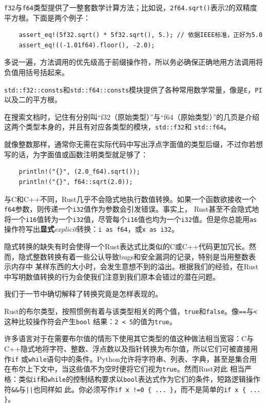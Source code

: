 \smallskip
\texttt{f32}与\texttt{f64}类型提供了一整套数学计算方法；比如说，\texttt{2f64.sqrt()}表示2的双精度平方根。下面是两个例子：
\begin{verbatim}
    assert_eq!(5f32.sqrt() * 5f32.sqrt(), 5.); // 依据IEEE标准，正好为5.0
    assert_eq!((-1.01f64).floor(), -2.0);
\end{verbatim}

\smallskip
多说一遍，方法调用的优先级高于前缀操作符，所以务必确保正确地用方法调用将负值用括号括起来。

\medskip
\texttt{std::f32::consts}和\texttt{std::f64::consts}模块提供了各种常用数学常量，像是\texttt{E}，\texttt{PI}以及二的平方根。

\medskip
在搜索文档时，记住有分别叫“f32（原始类型）”与“f64（原始类型）”的几页是介绍这两个类型本身的，并且有对应各类型的模块，\texttt{std::f32}和
\texttt{std::f64}。

\medskip
就像整数那样，通常你无需在实际代码中写出浮点字面值的类型后缀，不过你若想写的话，为字面值或函数注明类型就足够了：
\begin{verbatim}
    println!("{}", (2.0_f64).sqrt());
    println!("{}", f64::sqrt(2.0));
\end{verbatim}

\smallskip
与C和C++不同，Rust几乎不会隐式地执行数值转换。如果一个函数欲接收一个\texttt{f64}参数，则传递一个\texttt{i32}值作为参数会引发错误。事实上，
Rust甚至不会隐式地将一个\texttt{i16}值转为一个\texttt{i32}值，尽管每个\texttt{i16}值也均为一个\texttt{i32}值。但是你总能用\texttt{as}
操作符写出\textbf{显式}\textit{explicit}转换：\texttt{i as f64}，或\texttt{x as i32}。

\medskip
隐式转换的缺失有时会使得一个Rust表达式比类似的C或C++代码更加冗长。然而，隐式整数转换有着一些公认导致bugs和安全漏洞的记录，特别是当用整数表示内存中
某样东西的大小时，会发生意想不到的溢出。根据我们的经验，在Rust中写明数值转换的行为会使我们注意到我们原本会错过的潜在问题。

\medskip
我们于一节中确切解释了转换究竟是怎样表现的。

\bigskip
{}
Rust的布尔类型，按照惯例有着与该类型相关的两个值，\texttt{true}和\texttt{false}。像\texttt{==}与\texttt{<}这种比较操作符会产生\texttt{bool}
结果：\texttt{2 < 5}的值为\texttt{true}。

\medskip
许多语言对于在需要布尔值的情形下使用其它类型的值这种做法相当宽容：C与C++隐式地将字符、整数、浮点数以及指针转换为布尔值，所以它们可被直接用作\texttt{if}
或\texttt{while}语句中的条件。Python允许将字符串、列表、字典，甚至是集合用在布尔上下文中，当这些值不为空时便将它们视为\texttt{true}。然而Rust对此
相当严格：类似\texttt{if}和\texttt{while}的控制结构要求以\texttt{bool}表达式作为它们的条件，短路逻辑操作符\texttt{\&\&}与\texttt{||}也同样如
此。你必须写作\texttt{if x !=0 \{ ... \}}，而不是简单的\texttt{if x \{ ... \}}。

